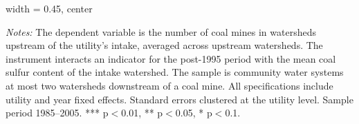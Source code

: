 \begin{table}[htbp]
\begin{adjustbox}{width = 0.45\textwidth, center}
      
   \end{adjustbox}
      {\tiny\linespread{1}\selectfont \par \raggedright 
   \textit{Notes:} The dependent variable is the number of coal mines in watersheds upstream of the utility's intake, averaged across upstream watersheds. The instrument interacts an indicator for the post-1995 period with the mean coal sulfur content of the intake watershed. The sample is community water systems at most two watersheds downstream of a coal mine. All specifications include utility and year fixed effects. Standard errors clustered at the utility level. Sample period 1985--2005. *** p$<$0.01, ** p$<$0.05, * p$<$0.1.}
   
\end{table}


